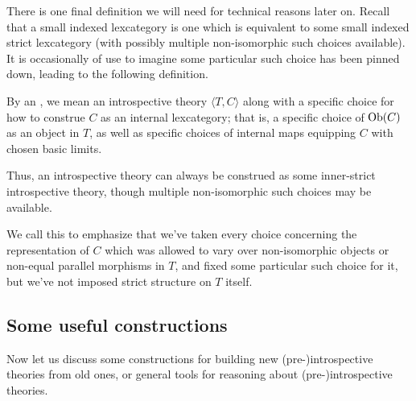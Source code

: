 \documentclass[./main.tex]{subfiles}
\begin{document}
There is one final definition we will need for technical reasons later on. Recall that a small indexed lexcategory is one which is equivalent to some small indexed strict lexcategory (with possibly multiple non-isomorphic such choices available). It is occasionally of use to imagine some particular such choice has been pinned down, leading to the following definition.

\begin{definition}
By an , we mean an introspective theory $\langle T, C\rangle$ along with a specific choice for how to construe $C$ as an internal lexcategory; that is, a specific choice of $\operatorname{Ob}(C)$ as an object in $T$, as well as specific choices of internal maps equipping $C$ with chosen basic limits.
\end{definition}

Thus, an introspective theory can always be construed as some inner-strict introspective theory, though multiple non-isomorphic such choices may be available. 

We call this  to emphasize that we've taken every choice concerning the representation of $C$ which was allowed to vary over non-isomorphic objects or non-equal parallel morphisms in $T$, and fixed some particular such choice for it, but we've not imposed strict structure on $T$ itself.

\subsection{Some useful constructions}
Now let us discuss some constructions for building new (pre-)introspective theories from old ones, or general tools for reasoning about (pre-)introspective theories.
\end{document}
